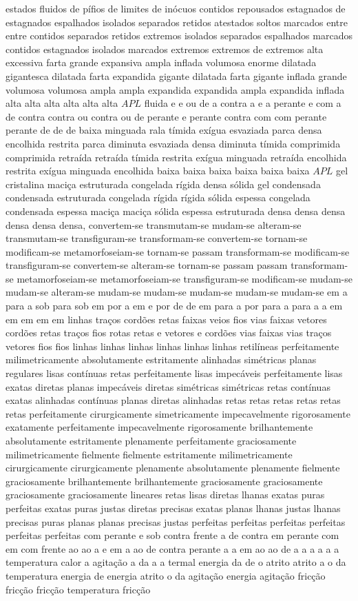 estados fluidos de pífios de limites de inócuos contidos repousados estagnados de estagnados espalhados isolados separados retidos atestados soltos marcados entre entre contidos separados retidos extremos isolados separados espalhados marcados contidos estagnados isolados marcados extremos extremos de extremos alta excessiva farta grande expansiva ampla inflada volumosa enorme dilatada gigantesca dilatada farta expandida gigante dilatada farta gigante inflada grande volumosa volumosa ampla ampla expandida expandida ampla expandida inflada alta alta alta alta alta alta $APL$ fluida e e ou de a contra a e a perante e com a de contra contra ou contra ou de perante e perante contra com com perante perante de de de baixa minguada rala tímida exígua esvaziada parca densa encolhida restrita parca diminuta esvaziada densa diminuta tímida comprimida comprimida retraída retraída tímida restrita exígua minguada retraída encolhida restrita exígua minguada encolhida baixa baixa baixa baixa baixa baixa $APL$ gel cristalina maciça estruturada congelada rígida densa sólida gel condensada condensada estruturada congelada rígida rígida sólida espessa congelada condensada espessa maciça maciça sólida espessa estruturada densa densa densa densa densa densa, convertem-se transmutam-se mudam-se alteram-se transmutam-se transfiguram-se transformam-se convertem-se tornam-se modificam-se metamorfoseiam-se tornam-se passam transformam-se modificam-se transfiguram-se convertem-se alteram-se tornam-se passam passam transformam-se metamorfoseiam-se metamorfoseiam-se transfiguram-se modificam-se mudam-se mudam-se alteram-se mudam-se mudam-se mudam-se mudam-se mudam-se em a para a sob para sob em por a em e por de de em para a por para a para a a em em em em em linhas traços cordões retas faixas veios fios vias faixas vetores cordões retas traços fios rotas retas e vetores e cordões vias faixas vias traços vetores fios fios linhas linhas linhas linhas linhas linhas retilíneas perfeitamente milimetricamente absolutamente estritamente alinhadas simétricas planas regulares lisas contínuas retas perfeitamente lisas impecáveis perfeitamente lisas exatas diretas planas impecáveis diretas simétricas simétricas retas contínuas exatas alinhadas contínuas planas diretas alinhadas retas retas retas retas retas retas perfeitamente cirurgicamente simetricamente impecavelmente rigorosamente exatamente perfeitamente impecavelmente rigorosamente brilhantemente absolutamente estritamente plenamente perfeitamente graciosamente milimetricamente fielmente fielmente estritamente milimetricamente cirurgicamente cirurgicamente plenamente absolutamente plenamente fielmente graciosamente brilhantemente brilhantemente graciosamente graciosamente graciosamente graciosamente lineares retas lisas diretas lhanas exatas puras perfeitas exatas puras justas diretas precisas exatas planas lhanas justas lhanas precisas puras planas planas precisas justas perfeitas perfeitas perfeitas perfeitas perfeitas perfeitas com perante e sob contra frente a de contra em perante com em com frente ao ao a e em a ao de contra perante a a em ao ao de a a a a a a temperatura calor a agitação a da a a termal energia da de o atrito atrito a o da temperatura energia de energia atrito o da agitação energia agitação fricção fricção fricção temperatura fricção 